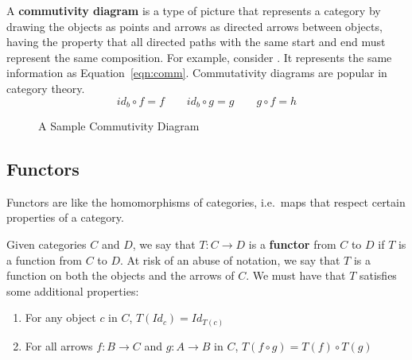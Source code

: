 \documentclass[14pt]{extarticle}  %
\begin{document}
\begin{defn}
  A \textbf{commutivity diagram} is a type of picture that represents a category by drawing the objects as points and arrows as directed arrows between objects, having the property that all directed
  paths with the same start and end must represent the same composition. For example, consider . It represents the same information as Equation~\ref{eqn:comm}.
  Commutativity diagrams are popular in category theory.
  \begin{equation}\label{eqn:comm}
    id_{b} \circ f = f \qquad id_{b} \circ g = g \qquad g \circ f = h
\end{equation}



  \begin{figure}[!h]
\centering
\caption{A Sample Commutivity Diagram}
\label{fig:commdia}
\end{figure}
\end{defn}


\subsection{Functors}
Functors are like the homomorphisms of categories, i.e.\ maps that respect certain properties of a category.

\begin{defn}
  Given categories $C$ and $D$, we say that $T : C \to D$ is a \textbf{functor} from $C$ to $D$ if $T$ is a function from $C$ to $D$.
  At risk of an abuse of notation, we say that $T$ is a function on both the objects and the arrows of $C$.
  We must have that $T$ satisfies some additional properties:
  \begin{enumerate}
    \item For any object $c$ in $C$, $T(Id_{c}) = Id_{T(c)}$
          \item For all arrows $f : B \to C$ and $g : A \to B$ in $C$, $T(f \circ g) = T(f) \circ T(g)$
    \end{enumerate}
\end{defn}
\end{document}
